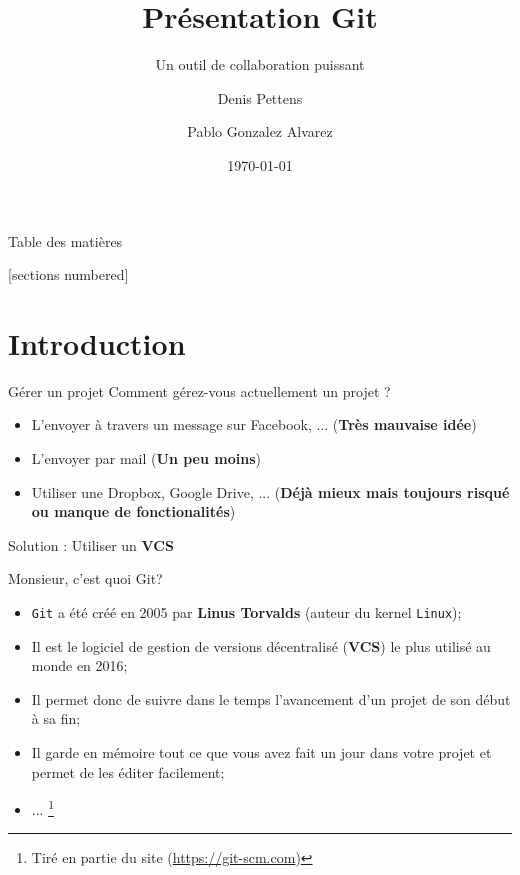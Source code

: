 \documentclass{beamer}
\title{Présentation Git}
\subtitle{Un outil de collaboration puissant}
\date{\today}
\author{Denis Pettens \and Pablo Gonzalez Alvarez}
\institute{Louvain-li-Nux}
\begin{document}
\maketitle

\begin{frame}{Table des matières}

[sections numbered]
\tableofcontents[hideallsubsections]

\end{frame}

\section{Introduction}

\begin{frame}{Gérer un projet}
Comment gérez-vous actuellement un projet ?

\begin{itemize}
    \item L'envoyer à travers un message sur Facebook, ... (\textbf{Très mauvaise idée})
    \item L'envoyer par mail (\textbf{Un peu moins})
    \item Utiliser une Dropbox, Google Drive, ... (\textbf{Déjà mieux mais toujours risqué ou manque de fonctionalités})
\end{itemize}

Solution : Utiliser un \textbf{VCS}
\end{frame}

\begin{frame}{Monsieur, c'est quoi Git?}
\begin{itemize}
    \item \texttt{Git} a été créé en 2005 par \textbf{Linus Torvalds} (auteur du kernel \texttt{Linux});
    \item Il est le logiciel de gestion de versions décentralisé (\textbf{VCS}) le plus utilisé au monde en 2016;
    \item Il permet donc de suivre dans le temps l'avancement d'un projet de son début à sa fin;
    \item Il garde en mémoire tout ce que vous avez fait un jour dans votre projet et permet de les éditer facilement;
    \item ... \footnote{Tiré en partie du site (\url{https://git-scm.com})}
\end{itemize}
\end{frame}
\end{document}
